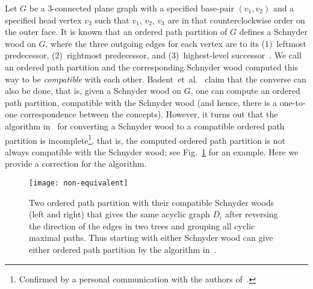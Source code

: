 \documentclass{article}
\newcommand{\df}{\textit}
\begin{document}
Let $G$ be a $3$-connected plane graph with a specified base-pair $(v_1,v_2)$ and a specified head
vertex $v_3$ such that $v_1$, $v_2$, $v_3$ are in that counterclockwise order on the outer face.
It is known that an ordered path partition of $G$ defines a Schnyder wood on $G$, where the three outgoing
edges for each vertex are to its (1)~leftmost predecessor, (2)~rightmost predecessor, and
(3)~highest-level successor~\cite{FZ08,BF12}. We call an ordered path partition and the corresponding Schnyder
wood computed this way to be \df{compatible} with each other.
Badent~et~al.~\cite{BBC11} claim that the converse can also be done, that is, given a Schnyder wood on $G$,
one can compute an ordered path partition, compatible with the Schnyder wood (and hence,
there is a one-to-one correspondence between the concepts).
However, it turns out that the algorithm in~\cite{BBC11} for converting a Schnyder wood to a compatible ordered path partition is incomplete\footnote{Confirmed by a personal communication with the authors of~\cite{BBC11}.}, that is, the computed ordered path partition is not always
compatible with the Schnyder wood; see Fig.~\ref{fig:non-eq}
for an example. Here we provide a correction for the algorithm.


\begin{figure}[t]
\centering
\texttt{[image: non-equivalent]}
\caption{Two ordered path partition with their compatible Schnyder woods (left and right) that gives the
 same acyclic graph $D_i$ after reversing the direction of the edges in two trees and grouping all cyclic
 maximal paths. Thus starting with either Schnyder wood can give either ordered path partition by the
 algorithm in~\cite{BBC11}.}
\label{fig:non-eq}
\end{figure}
\end{document}
